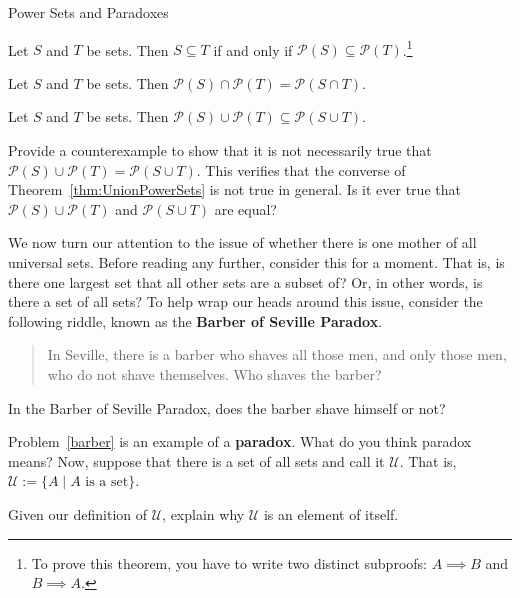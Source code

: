 \begin{section}{Power Sets and Paradoxes}
\begin{theorem}
Let $S$ and $T$ be sets.  Then $S\subseteq T$ if and only if $\mathcal{P}(S)\subseteq \mathcal{P}(T)$.\footnote{To prove this theorem, you have to write two distinct subproofs: $A\implies B$ and $B\implies A$.}
\end{theorem}

\begin{theorem}
Let $S$ and $T$ be sets.  Then $\mathcal{P}(S)\cap\mathcal{P}(T)=\mathcal{P}(S\cap T)$.
\end{theorem}

\begin{theorem}\label{thm:UnionPowerSets}
Let $S$ and $T$ be sets.  Then $\mathcal{P}(S)\cup\mathcal{P}(T)\subseteq \mathcal{P}(S\cup T)$.
\end{theorem}

\begin{problem}
Provide a counterexample to show that it is not necessarily true that $\mathcal{P}(S)\cup\mathcal{P}(T)= \mathcal{P}(S\cup T)$. This verifies that the converse of Theorem~\ref{thm:UnionPowerSets} is not true in general. Is it ever true that $\mathcal{P}(S)\cup\mathcal{P}(T)$ and  $\mathcal{P}(S\cup T)$ are equal?
\end{problem}

We now turn our attention to the issue of whether there is one mother of all universal sets.  Before reading any further, consider this for a moment.  That is, is there one largest set that all other sets are a subset of?  Or, in other words, is there a set of all sets?  To help wrap our heads around this issue, consider the following riddle, known as the \textbf{Barber of Seville Paradox}.

\begin{quote}
In Seville, there is a barber who shaves all those men, and only those men, who do not shave themselves.  Who shaves the barber?
\end{quote}

\begin{problem}\label{barber}
In the Barber of Seville Paradox, does the barber shave himself or not?
\end{problem}

Problem~\ref{barber} is an example of a \textbf{paradox}.  What do you think paradox means?  Now, suppose that there is a set of all sets and call it $\mathcal{U}$.  That is, $\mathcal{U}:=\{A\mid A\mbox{ is a set}\}$.

\begin{problem}
Given our definition of $\mathcal{U}$, explain why $\mathcal{U}$ is an element of itself.
\end{problem}


\end{section}
